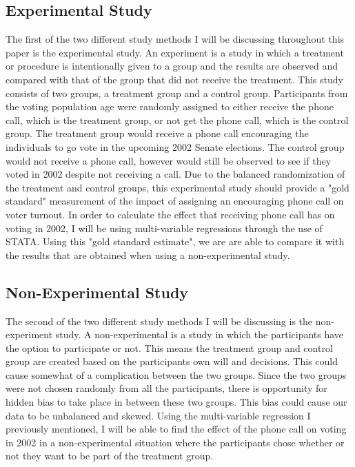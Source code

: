 \documentclass[a4paper]{article}
\begin{document}
\subsection{Experimental Study}

The first of the two different study methods I will be discussing throughout this paper is the experimental study. An experiment is a study in which a treatment or procedure is intentionally given to a group and the results are observed and compared with that of the group that did not receive the treatment. This study consists of two groups, a treatment group and a control group. Participants from the voting population age were randomly assigned to either receive the phone call, which is the treatment group, or not get the phone call, which is the control group. The treatment group would receive a phone call encouraging the individuals to go vote in the upcoming 2002 Senate elections. The control group would not receive a phone call, however would still be observed to see if they voted in 2002 despite not receiving a call. Due to the balanced randomization of the treatment and control groups, this experimental study should provide a "gold standard" measurement of the impact of assigning an encouraging phone call on voter turnout. In order to calculate the effect that receiving phone call has on voting in 2002, I will be using multi-variable regressions through the use of STATA. Using this "gold standard estimate", we are are able to compare it with the results that are obtained when using a non-experimental study. 

\subsection{Non-Experimental Study}

The second of the two different study methods I will be discussing is the non-experiment study. A non-experimental is a study in which the participants have the option to participate or not. This means the treatment group and control group are created based on the participants own will and decisions. This could cause somewhat of a complication between the two groups. Since the two groups were not chosen randomly from all the participants, there is opportunity for hidden bias to take place in between these two groups. This bias could cause our data to be unbalanced and skewed. Using the multi-variable regression I previously mentioned, I will be able to find the effect of the phone call on voting in 2002 in a non-experimental situation where the participants chose whether or not they want to be part of the treatment group. 
\end{document}
